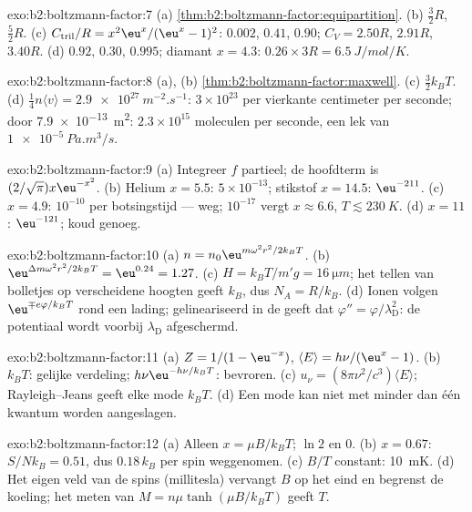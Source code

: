 \begin{solution}{exo:b2:boltzmann-factor:7}
(a) \cref{thm:b2:boltzmann-factor:equipartition}. (b) $\tfrac32R$,
$\tfrac52R$. (c) $C_{\text{tril}}/R = x^2\eu^x/(\eu^x - 1)^2$: $0.002$,
$0.41$, $0.90$;
$C_V = 2.50R$, $2.91R$, $3.40R$. (d) $0.92$, $0.30$, $0.995$; diamant $x = 4.3$:
$0.26 \times 3R = \qty{6.5}{J/mol/K}$.
\end{solution}

\begin{solution}{exo:b2:boltzmann-factor:8}
(a), (b) \cref{thm:b2:boltzmann-factor:maxwell}. (c) $\tfrac32k_BT$. (d)
$\tfrac14n\langle v\rangle = \qty{2.9e27}{m^{-2}.s^{-1}}$:
$3 \times 10^{23}$ per vierkante
centimeter per seconde; door \qty{7.9e-13}{m^2}: $2.3 \times 10^{15}$
moleculen per seconde, een lek van $\qty{1e-5}{Pa.m^3/s}$.
\end{solution}

\begin{solution}{exo:b2:boltzmann-factor:9}
(a) Integreer $f$ partieel; de hoofdterm is $(2/\sqrt\pi)x\eu^{-x^2}$. (b)
Helium $x = 5.5$: $5 \times 10^{-13}$; stikstof $x = 14.5$: $\eu^{-211}$.
(c) $x =
4.9$: $10^{-10}$ per botsingstijd --- weg; $10^{-17}$ vergt
$x \approx 6.6$,
$T \lesssim \qty{230}{K}$. (d) $x = 11$: $\eu^{-121}$; koud genoeg.
\end{solution}

\begin{solution}{exo:b2:boltzmann-factor:10}
(a) $n = n_0\eu^{m\omega^2r^2/2k_BT}$. (b)
$\eu^{\Delta m\omega^2r^2/2k_BT} = \eu^{0.24} =
1.27$. (c)
$H = k_BT/m'g = \qty{16}{\micro m}$; het tellen van bolletjes op
verscheidene hoogten geeft $k_B$, dus $N_A = R/k_B$. (d) Ionen volgen
$\eu^{\mp e\varphi/k_BT}$ rond een lading; gelineariseerd in de 
geeft dat $\varphi'' = \varphi/\lambda_{\text{D}}^2$: de potentiaal wordt voorbij
$\lambda_{\text{D}}$ afgeschermd.
\end{solution}

\begin{solution}{exo:b2:boltzmann-factor:11}
(a) $Z = 1/(1 - \eu^{-x})$, $\langle E\rangle = h\nu/(\eu^x - 1)$. (b) $k_BT$:
gelijke verdeling; $h\nu\eu^{-h\nu/k_BT}$: bevroren. (c)
$u_\nu = (8\pi\nu^2/c^3)\langle E
\rangle$; Rayleigh--Jeans geeft elke mode
$k_BT$. (d) Een mode kan niet met
minder dan één kwantum worden aangeslagen.
\end{solution}

\begin{solution}{exo:b2:boltzmann-factor:12}
(a) Alleen $x = \mu B/k_BT$; $\ln 2$ en $0$. (b) $x = 0.67$: $S/Nk_B = 0.51$, dus
$0.18\,k_B$ per spin weggenomen. (c) $B/T$ constant: \qty{10}{mK}. (d) Het eigen
veld van de spins (millitesla) vervangt $B$ op het eind en begrenst de koeling;
het meten van $M = n\mu\tanh(\mu B/k_BT)$ geeft $T$.
\end{solution}

